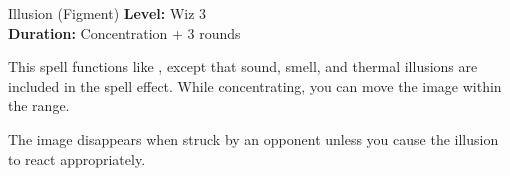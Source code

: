 {Illusion (Figment)}
{
	\textbf{Level:}
	Wiz 3\\
	\textbf{Duration:}
	Concentration + 3 rounds\\
}
{
	This spell functions like , except that sound, smell, and thermal illusions are included in the spell effect. While concentrating, you can move the image within the range.

	The image disappears when struck by an opponent unless you cause the illusion to react appropriately.

}
